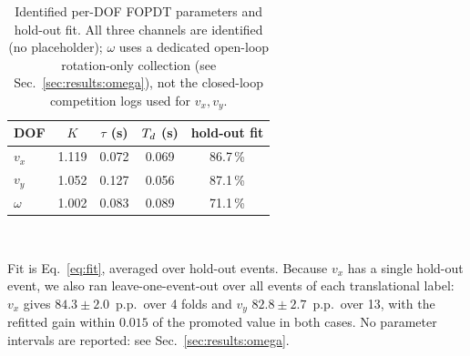 \begin{table}[t]
  \caption{Identified per-DOF FOPDT parameters and hold-out fit. All three
  channels are identified (no placeholder); $\omega$ uses a dedicated
  open-loop rotation-only collection (see Sec.~\ref{sec:results:omega}), not
  the closed-loop competition logs used for $v_x,v_y$.}
  \label{tab:sysid}
  \centering
  \begin{tabular}{lcccc}
    \toprule
    DOF & $K$ & $\tau$ (s) & $T_{d}$ (s) & hold-out fit \\
    \midrule
    $v_x$     & 1.119 & 0.072 & 0.069 & 86.7\,\% \\
    $v_y$     & 1.052 & 0.127 & 0.056 & 87.1\,\% \\
    $\omega$  & 1.002 & 0.083 & 0.089 & 71.1\,\% \\
    \bottomrule
  \end{tabular}
  \\[2pt]
  \raggedright\footnotesize Fit is Eq.~\ref{eq:fit}, averaged over hold-out
  events. Because $v_x$ has a single hold-out event, we also ran
  leave-one-event-out over all events of each translational label: $v_x$ gives
  $84.3\pm2.0$~p.p.\ over 4 folds and $v_y$ $82.8\pm2.7$~p.p.\ over 13, with the
  refitted gain within $0.015$ of the promoted value in both cases. No parameter
  intervals are reported: see Sec.~\ref{sec:results:omega}.
\end{table}
